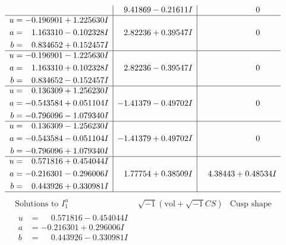 \documentclass[1p]{elsarticle_modified}
\theoremstyle{definition}
\newcommand{\I}{\sqrt{-1}}
\begin{document}
$$\begin{array}{c|c|c}
 & \phantom{-}9.41869 - 0.21611 I & \phantom{-0.000000 } 0 \\ \hline\begin{aligned}
u &= -0.196901 + 1.225630 I \\
a &= \phantom{-}1.163310 - 0.102328 I \\
b &= \phantom{-}0.834652 + 0.152457 I\end{aligned}
 & \phantom{-}2.82236 + 0.39547 I & \phantom{-0.000000 } 0 \\ \hline\begin{aligned}
u &= -0.196901 - 1.225630 I \\
a &= \phantom{-}1.163310 + 0.102328 I \\
b &= \phantom{-}0.834652 - 0.152457 I\end{aligned}
 & \phantom{-}2.82236 - 0.39547 I & \phantom{-0.000000 } 0 \\ \hline\begin{aligned}
u &= \phantom{-}0.136309 + 1.256230 I \\
a &= -0.543584 + 0.051104 I \\
b &= -0.796096 - 1.079340 I\end{aligned}
 & -1.41379 - 0.49702 I & \phantom{-0.000000 } 0 \\ \hline\begin{aligned}
u &= \phantom{-}0.136309 - 1.256230 I \\
a &= -0.543584 - 0.051104 I \\
b &= -0.796096 + 1.079340 I\end{aligned}
 & -1.41379 + 0.49702 I & \phantom{-0.000000 } 0 \\ \hline\begin{aligned}
u &= \phantom{-}0.571816 + 0.454044 I \\
a &= -0.216301 - 0.296006 I \\
b &= \phantom{-}0.443926 + 0.330981 I\end{aligned}
 & \phantom{-}1.77754 + 0.38509 I & \phantom{-}4.38443 + 0.48534 I\\
 \hline 
 \end{array}$$\newpage$$\begin{array}{c|c|c}  
\text{Solutions to }I^u_{1}& \I (\text{vol} + \sqrt{-1}CS) & \text{Cusp shape}\\
 \hline 
\begin{aligned}
u &= \phantom{-}0.571816 - 0.454044 I \\
a &= -0.216301 + 0.296006 I \\
b &= \phantom{-}0.443926 - 0.330981 I\end{aligned}

\end{array}$$
\end{document}
